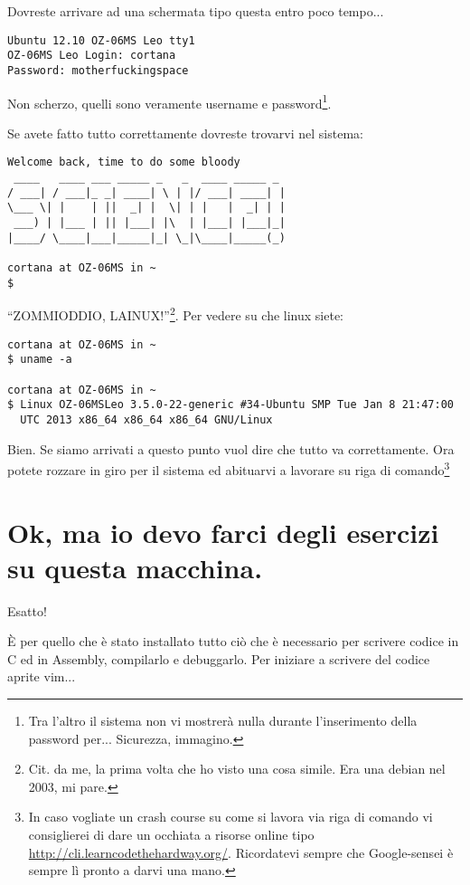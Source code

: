 \documentclass[a4paper]{memoir}
\begin{document}
		Dovreste arrivare ad una schermata tipo questa entro poco tempo...
		
		\begin{Verbatim}[label=Login + Password]
Ubuntu 12.10 OZ-06MS Leo tty1
OZ-06MS Leo Login: cortana
Password: motherfuckingspace
		\end{Verbatim}

		Non scherzo, quelli sono veramente username e password\footnote{Tra l'altro il sistema non vi mostrerà
		nulla durante l'inserimento della password per... Sicurezza, immagino.}.
		
		Se avete fatto tutto correttamente dovreste trovarvi nel sistema:

		\begin{Verbatim}[label=Party like it's 1999!]
Welcome back, time to do some bloody
 ____   ____ ___ _____ _   _  ____ _____ _ 
/ ___| / ___|_ _| ____| \ | |/ ___| ____| |
\___ \| |    | ||  _| |  \| | |   |  _| | |
 ___) | |___ | || |___| |\  | |___| |___|_|
|____/ \____|___|_____|_| \_|\____|_____(_)

cortana at OZ-06MS in ~
$ 
		\end{Verbatim}
		
		``ZOMMIODDIO, LAINUX!''\footnote{Cit. da me, la prima volta che ho visto una cosa simile. Era una debian
		nel 2003, mi pare.}. Per vedere su che linux siete:
		
		\begin{Verbatim}
cortana at OZ-06MS in ~
$ uname -a

cortana at OZ-06MS in ~
$ Linux OZ-06MSLeo 3.5.0-22-generic #34-Ubuntu SMP Tue Jan 8 21:47:00
  UTC 2013 x86_64 x86_64 x86_64 GNU/Linux
		\end{Verbatim}

		Bien. Se siamo arrivati a questo punto vuol dire che tutto va correttamente. Ora potete
		rozzare in giro per il sistema ed abituarvi a lavorare su riga di comando\footnote{In caso vogliate un
		crash course su come si lavora via riga di comando vi consiglierei di dare un occhiata a risorse online
		tipo \url{http://cli.learncodethehardway.org/}. Ricordatevi sempre che Google-sensei è sempre lì pronto
		a darvi una mano.}
		
	\section{Ok, ma io devo farci degli esercizi su questa macchina.}
		
		Esatto!
		
		È per quello che è stato installato tutto ciò che è necessario per scrivere codice in C ed in Assembly,
        compilarlo e debuggarlo. Per iniziare a scrivere del codice aprite vim...
        
\end{document}
